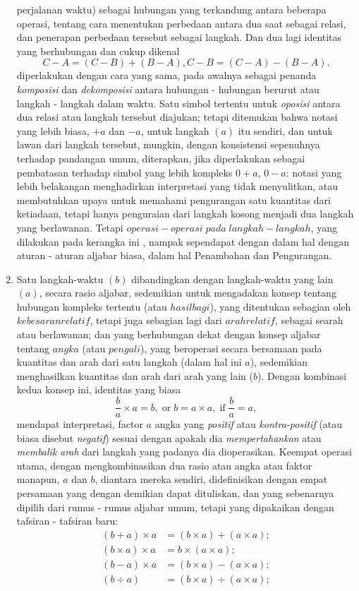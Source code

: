 \documentclass[a4paper, 12pt]{book}
\begin{document}
\begin{enumerate}
perjalanan waktu) sebagai hubungan yang terkandung antara beberapa operasi,
tentang  cara menentukan perbedaan antara dua saat sebagai relasi, dan 
penerapan perbedaan tersebut sebagai langkah. Dan dua lagi identitas yang 
berhubungan dan cukup dikenal
\[
C - A = (C - B) + (B - A), C - B = (C - A) - (B - A).
\]
diperlakukan dengan cara yang sama, pada awalnya sebagai penanda 
\textit{komposisi} dan \textit{dekomposisi} antara hubungan - hubungan berurut
atau langkah - langkah dalam waktu. Satu simbol tertentu untuk \textit{oposisi}
antara dua relasi atau langkah tersebut diajukan; tetapi ditemukan bahwa
notasi yang lebih biasa, $+a$ dan $-a$, untuk langkah $(a)$ itu sendiri, dan
untuk lawan dari langkah tersebut, mungkin, dengan konsistensi sepenuhnya 
terhadap pandangan umum, diterapkan, jika diperlakukan sebagai pembatasan
terhadap simbol yang lebih kompleks $0 + a$, $0 - a$: notasi yang lebih 
belakangan menghadirkan interpretasi yang tidak menyulitkan, atau membutuhkan
upaya untuk memahami pengurangan satu kuantitas dari ketiadaan, tetapi hanya
penguraian dari langkah kosong menjadi dua langkah yang berlawanan. Tetapi 
$operasi - operasi \; pada \; langkah - langkah$, yang dilakukan pada kerangka ini
, nampak sependapat dengan dalam hal dengan aturan - aturan aljabar biasa, 
dalam hal Penambahan dan Pengurangan.
\item Satu langkah-waktu $(b)$ dibandingkan dengan langkah-waktu yang lain
$(a)$, secara rasio aljabar, sedemikian untuk mengadakan konsep tentang
hubungan kompleks tertentu (atau $hasil bagi$), yang ditentukan sebagian oleh
$kebesaran relatif$, tetapi juga sebagian lagi dari $arah relatif$, sebagai
searah atau berlawanan; dan yang berhubungan dekat dengan konsep aljabar 
tentang $angka$ (atau $pengali$), yang beroperasi secara bersamaan pada
kuantitas dan arah dari satu langkah (dalam hal ini $a$), sedemikian 
menghasilkan kuantitas dan arah dari arah yang lain ($b$). Dengan kombinasi
kedua konsep ini, identitas yang biasa
\[
\frac{b}{a} \times a = b, \; \text{or} \;  b = a \times a, \;\text{if} \; \frac{b}{a}=a,
\] 
mendapat interpretasi, factor $a$ angka yang \textit{positif} atau 
\textit{kontra-positif} (atau biasa disebut \textit{negatif}) sesuai dengan
apakah dia \textit{mempertahankan} atau \textit{membalik} \textit{arah} dari
langkah yang padanya dia dioperasikan. Keempat operasi utama, dengan 
mengkombinasikan dua rasio atau angka atau faktor manapun, $a$ dan $b$, 
diantara mereka sendiri, didefinisikan dengan empat persamaan yang dengan
demikian dapat dituliskan, dan yang sebenarnya dipilih dari rumus - rumus
aljabar umum, tetapi yang dipakaikan dengan tafsiran - tafsiran baru:
\begin{align*}
(b + a) \times a  &= (b \times a) + (a \times a); \\
(b \times a) \times a  &= b \times (a \times a); \\
(b - a) \times a  &= (b \times a) - (a \times a); \\
(b \div a) &= (b \times a) \div (a \times a); \\
\end{align*}

\end{enumerate}
\end{document}
